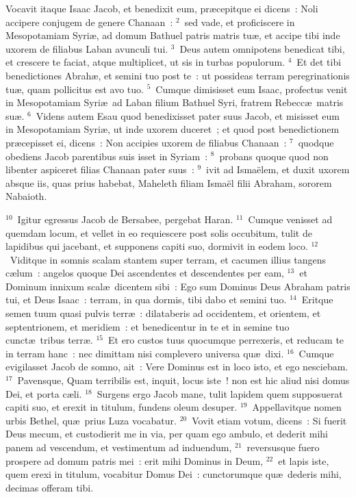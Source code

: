 \lettrine[lines=3,image=true,loversize=0.05,lraise=-0.03]{V}{}ocavit itaque Isaac Jacob, et benedixit eum, pr\ae cepitque ei dicens~: Noli accipere conjugem de genere Chanaan~:
${}^{2}$~sed vade, et proficiscere in Mesopotamiam Syri\ae , ad domum Bathuel patris matris tu\ae , et accipe tibi inde uxorem de filiabus Laban avunculi tui.
${}^{3}$~Deus autem omnipotens benedicat tibi, et crescere te faciat, atque multiplicet, ut sis in turbas populorum.
${}^{4}$~Et det tibi benedictiones Abrah\ae , et semini tuo post te~: ut possideas terram peregrinationis tu\ae , quam pollicitus est avo tuo.
${}^{5}$~Cumque dimisisset eum Isaac, profectus venit in Mesopotamiam Syri\ae\ ad Laban filium Bathuel Syri, fratrem Rebecc\ae\ matris su\ae .
${}^{6}$~Videns autem Esau quod benedixisset pater suus Jacob, et misisset eum in Mesopotamiam Syri\ae , ut inde uxorem duceret~; et quod post benedictionem pr\ae cepisset ei, dicens~: Non accipies uxorem de filiabus Chanaan~:
${}^{7}$~quodque obediens Jacob parentibus suis isset in Syriam~:
${}^{8}$~probans quoque quod non libenter aspiceret filias Chanaan pater suus~:
${}^{9}$~ivit ad Isma\"elem, et duxit uxorem absque iis, quas prius habebat, Maheleth filiam Isma\"el filii Abraham, sororem Nabaioth.


${}^{10}$~Igitur egressus Jacob de Bersabee, pergebat Haran.
${}^{11}$~Cumque venisset ad quemdam locum, et vellet in eo requiescere post solis occubitum, tulit de lapidibus qui jacebant, et supponens capiti suo, dormivit in eodem loco.
${}^{12}$~Viditque in somnis scalam stantem super terram, et cacumen illius tangens c\ae lum~: angelos quoque Dei ascendentes et descendentes per eam,
${}^{13}$~et Dominum innixum scal\ae\ dicentem sibi~: Ego sum Dominus Deus Abraham patris tui, et Deus Isaac~: terram, in qua dormis, tibi dabo et semini tuo.
${}^{14}$~Eritque semen tuum quasi pulvis terr\ae~: dilataberis ad occidentem, et orientem, et septentrionem, et meridiem~: et benedicentur in te et in semine tuo cunct\ae\ tribus terr\ae .
${}^{15}$~Et ero custos tuus quocumque perrexeris, et reducam te in terram hanc~: nec dimittam nisi complevero universa qu\ae\ dixi.
${}^{16}$~Cumque evigilasset Jacob de somno, ait~: Vere Dominus est in loco isto, et ego nesciebam.
${}^{17}$~Pavensque, Quam terribilis est, inquit, locus iste~! non est hic aliud nisi domus Dei, et porta c\ae li.
${}^{18}$~Surgens ergo Jacob mane, tulit lapidem quem supposuerat capiti suo, et erexit in titulum, fundens oleum desuper.
${}^{19}$~Appellavitque nomen urbis Bethel, qu\ae\ prius Luza vocabatur.
${}^{20}$~Vovit etiam votum, dicens~: Si fuerit Deus mecum, et custodierit me in via, per quam ego ambulo, et dederit mihi panem ad vescendum, et vestimentum ad induendum,
${}^{21}$~reversusque fuero prospere ad domum patris mei~: erit mihi Dominus in Deum,
${}^{22}$~et lapis iste, quem erexi in titulum, vocabitur Domus Dei~: cunctorumque qu\ae\ dederis mihi, decimas offeram tibi.

